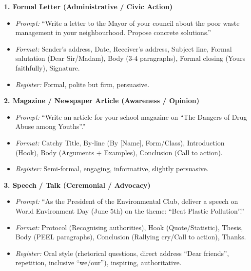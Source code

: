 \documentclass[11pt]{article}
\begin{document}
\begin{exemplebox}
\textbf{1. Formal Letter (Administrative / Civic Action)}
\begin{itemize}
    \item \textit{Prompt:} ``Write a letter to the Mayor of your council about the poor waste management in your neighbourhood. Propose concrete solutions.''
    \item \textit{Format:} Sender's address, Date, Receiver's address, Subject line, Formal salutation (Dear Sir/Madam), Body (3-4 paragraphs), Formal closing (Yours faithfully), Signature.
    \item \textit{Register:} Formal, polite but firm, persuasive.
\end{itemize}

\textbf{2. Magazine / Newspaper Article (Awareness / Opinion)}
\begin{itemize}
    \item \textit{Prompt:} ``Write an article for your school magazine on ``The Dangers of Drug Abuse among Youths''.''
    \item \textit{Format:} Catchy Title, By-line (By [Name], Form/Class), Introduction (Hook), Body (Arguments + Examples), Conclusion (Call to action).
    \item \textit{Register:} Semi-formal, engaging, informative, slightly persuasive.
\end{itemize}

\textbf{3. Speech / Talk (Ceremonial / Advocacy)}
\begin{itemize}
    \item \textit{Prompt:} ``As the President of the Environmental Club, deliver a speech on World Environment Day (June 5th) on the theme: ``Beat Plastic Pollution''.''
    \item \textit{Format:} Protocol (Recognising authorities), Hook (Quote/Statistic), Thesis, Body (PEEL paragraphs), Conclusion (Rallying cry/Call to action), Thanks.
    \item \textit{Register:} Oral style (rhetorical questions, direct address ``Dear friends'', repetition, inclusive ``we/our''), inspiring, authoritative.
\end{itemize}
\end{exemplebox}
\end{document}
